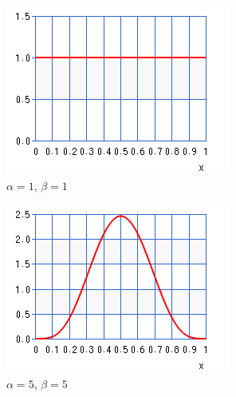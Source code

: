 \begin{figure}[htbp]
    \begin{subfigure}{0.5\textwidth}
        \includegraphics[width=\textwidth]{images/beta_1_1.png}
        \caption{$\alpha=1$, $\beta=1$}
        \label{sec:bhh:hyper_parameters:normalisation_beta_1_1}
    \end{subfigure}
    \begin{subfigure}{0.5\textwidth}
        \includegraphics[width=\textwidth]{images/beta_5_5.png}
        \caption{$\alpha=5$, $\beta=5$}
        \label{sec:bhh:hyper_parameters:normalisation_beta_5_5}
    \end{subfigure}
    \par\bigskip
    \begin{subfigure}{0.5\textwidth}

\end{subfigure}
\end{figure}
